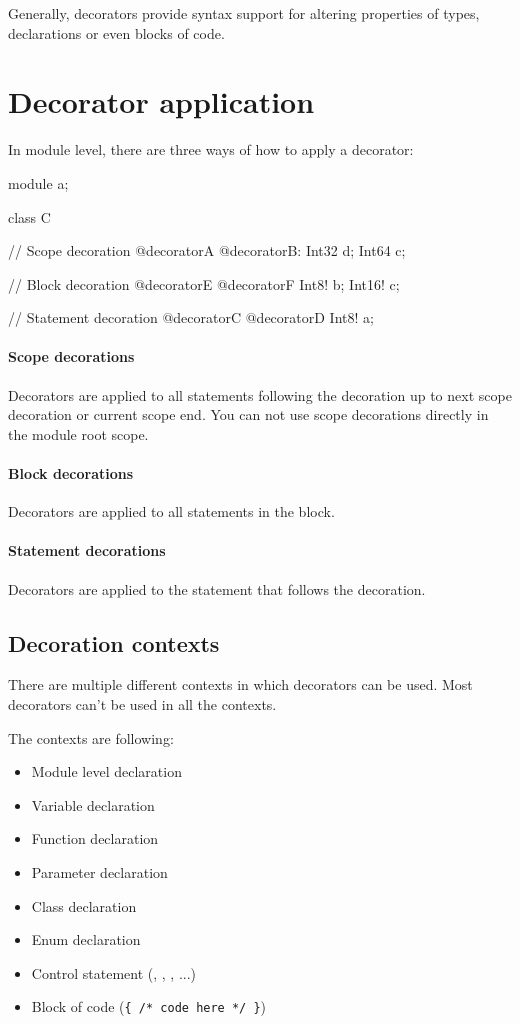 Generally, decorators provide syntax support for altering properties of types, declarations or even blocks of code.

\section{Decorator application}
In module level, there are three ways of how to apply a decorator:
\begin{code}
module a;

class C {
	
// Scope decoration
@decoratorA @decoratorB:
	Int32 d;
	Int64 c;
	
	// Block decoration
	@decoratorE @decoratorF {
		Int8! b;
		Int16! c;	
	}
	
	// Statement decoration
	@decoratorC @decoratorD Int8! a;
				
}
\end{code}

\paragraph{Scope decorations} Decorators are applied to all statements following the decoration up to next scope decoration or current scope end. You can not use scope decorations directly in the module root scope.

\paragraph{Block decorations} Decorators are applied to all statements in the block.

\paragraph{Statement decorations} Decorators are applied to the statement that follows the decoration.

\subsection{Decoration contexts} \label{decorationContexts}
There are multiple different contexts in which decorators can be used. Most decorators can't be used in all the contexts.

The contexts are following:
\begin{itemize}
	\item Module level declaration
	\item Variable declaration
	\item Function declaration
	\item Parameter declaration
	\item Class declaration
	\item Enum declaration
	\item Control statement (, , , ...)
	\item Block of code (\verb|{ /* code here */ }|)
\end{itemize}

